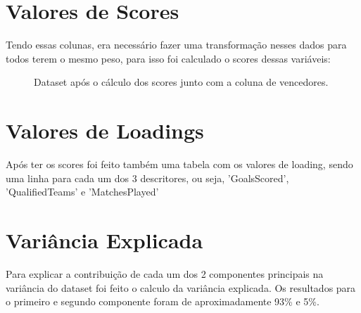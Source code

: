 \documentclass{article}
\begin{document}
\section*{Valores de Scores}
\begin{flushleft}
    Tendo essas colunas, era necessário fazer uma transformação nesses dados para todos terem o mesmo peso, para isso foi calculado o scores dessas variáveis:
\end{flushleft}
\begin{figure}[h!]
    \centering
    \qquad
    \label{fig:example}%
    \caption{Dataset após o cálculo dos scores junto com a coluna de vencedores.}
\end{figure}

\section*{Valores de Loadings}
\begin{flushleft}
    Após ter os scores foi feito também uma tabela com os valores de loading, sendo uma linha para cada um dos 3 descritores, ou seja, 'GoalsScored', 'QualifiedTeams' e 'MatchesPlayed'
\end{flushleft}

\section*{Variância Explicada}
\begin{flushleft}
    Para explicar a contribuição de cada um dos 2 componentes principais na variância do dataset foi feito o calculo da variância explicada. Os resultados para o primeiro e segundo componente foram de aproximadamente 93\% e 5\%.
\end{flushleft}
\end{document}
